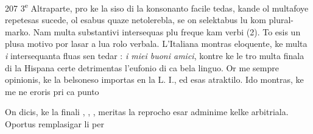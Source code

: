 \begin{VUpage}[211]{207}
3\textsuperscript{e} Altraparte, pro ke la siso di la konsonanto  facile\nl
tedas, kande ol multafoye repetesas sucede, ol esabus quaze\nl
netolerebla, se on selektabus lu kom plural-marko. Nam\nl
multa substantivi intersequas plu freque kam verbi (2).\nl
To esis un plusa motivo por lasar a  lua rolo verbala.\nl
L'Italiana montras eloquente, ke multa \textit{i} intersequanta\nl
fluas sen tedar : \textit{i miei buoni amici}, kontre ke le tro multa \nl
finala di la Hispana certe detrimentas l'eufonio di ca bela\nl
linguo. Or me sempre opinionis, ke la belsoneso importas\nl
en la L. I., ed esas atraktilo. Ido montras, ke me ne eroris\nl
pri ca punto

\VUsaut{7.04mm}
On dicis, ke la finali , , ,  meritas la reprocho\nl
esar adminime kelke arbitriala. Oportus remplasigar li per
\end{VUpage}

